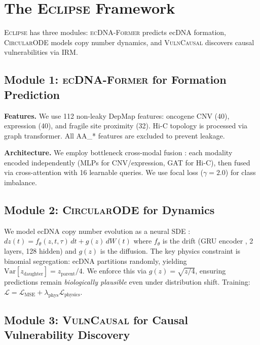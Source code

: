 \documentclass{article}
\newcommand{\eclipse}{\textsc{Eclipse}}
\newcommand{\former}{\textsc{ecDNA-Former}}
\newcommand{\circularode}{\textsc{CircularODE}}
\newcommand{\vulncausal}{\textsc{VulnCausal}}
\begin{document}
\section{The \eclipse{} Framework}
\label{sec:method}

\eclipse{} has three modules: \former{} predicts ecDNA formation, \circularode{} models copy number dynamics, and \vulncausal{} discovers causal vulnerabilities via IRM.

\subsection{Module 1: \former{} for Formation Prediction}
\label{sec:formation}

\textbf{Features.} We use 112 non-leaky DepMap features: oncogene CNV (40), expression (40), and fragile site proximity (32). Hi-C topology is processed via graph transformer. All AA\_* features are excluded to prevent leakage.

\textbf{Architecture.} We employ bottleneck cross-modal fusion \citep{jaegle_2021_perceiver}: each modality encoded independently (MLPs for CNV/expression, GAT \citep{velickovic_2018_gat} for Hi-C), then fused via cross-attention with 16 learnable queries. We use focal loss \citep{lin_2017_focal} ($\gamma=2.0$) for class imbalance.

\subsection{Module 2: \circularode{} for Dynamics}
\label{sec:dynamics}

We model ecDNA copy number evolution as a neural SDE \citep{li_2020_neuralsde}:
$dz(t) = f_\theta(z, t, \tau) \, dt + g(z) \, dW(t)$
where $f_\theta$ is the drift (GRU encoder \citep{cho_2014_gru}, 2 layers, 128 hidden) and $g(z)$ is the diffusion. The key physics constraint is binomial segregation: ecDNA partitions randomly, yielding $\text{Var}[z_{\text{daughter}}] = z_{\text{parent}}/4$. We enforce this via $g(z) = \sqrt{z/4}$, ensuring predictions remain \textit{biologically plausible} even under distribution shift. Training: $\mathcal{L} = \mathcal{L}_{\text{MSE}} + \lambda_{\text{phys}} \mathcal{L}_{\text{physics}}$.

\subsection{Module 3: \vulncausal{} for Causal Vulnerability Discovery}
\label{sec:vulnerability}
\end{document}
